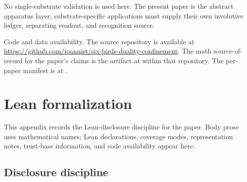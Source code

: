 \documentclass[11pt]{article}
\theoremstyle{definition}
\begin{document}
No single-substrate validation is used here.  The present paper is
the abstract apparatus layer; substrate-specific applications must
supply their own involutive ledger, separating readout, and
recognition source.

Code and data availability.  The source repository is available at
\url{https://github.com/ioannist/six-birds-duality-confinement}.
The math source-of-record for the paper's claims is the artifact at
 within
that repository.  The per-paper manifest is at
.
 
\appendix


\section{Lean formalization}
\label{app:formalization}

This appendix records the Lean-disclosure discipline for the paper.
Body prose uses mathematical names; Lean declarations, coverage modes,
representation notes, trust-base information, and code availability
appear here.

\subsection*{Disclosure discipline}
\end{document}
